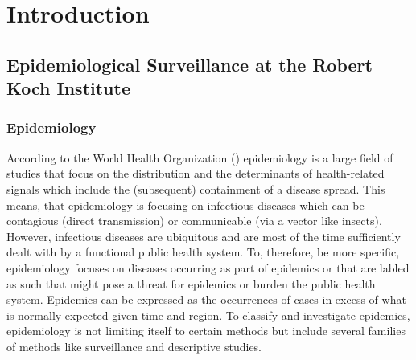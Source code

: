 \chapter{Introduction}
%
%
%


\section{Epidemiological Surveillance at the Robert Koch Institute}

\subsection{Epidemiology}
According to the World Health Organization () \cite{WHOepi} epidemiology is a large field of studies that focus
on the distribution and the determinants of health-related signals which include the (subsequent)
containment of a disease spread. This means, that epidemiology is focusing on infectious diseases which can be contagious (direct transmission) or communicable (via a vector like insects). However, infectious diseases are ubiquitous and are most of the time sufficiently dealt with by a functional public health system. To, therefore, be more specific, epidemiology focuses on diseases occurring as part of epidemics or that are labled as such that might pose a threat for epidemics or burden the public health system. Epidemics can be expressed as the occurrences of cases in excess of what is normally expected given time and region. To classify and investigate epidemics, epidemiology is not limiting itself to certain methods but include several families of methods like surveillance and descriptive studies.

